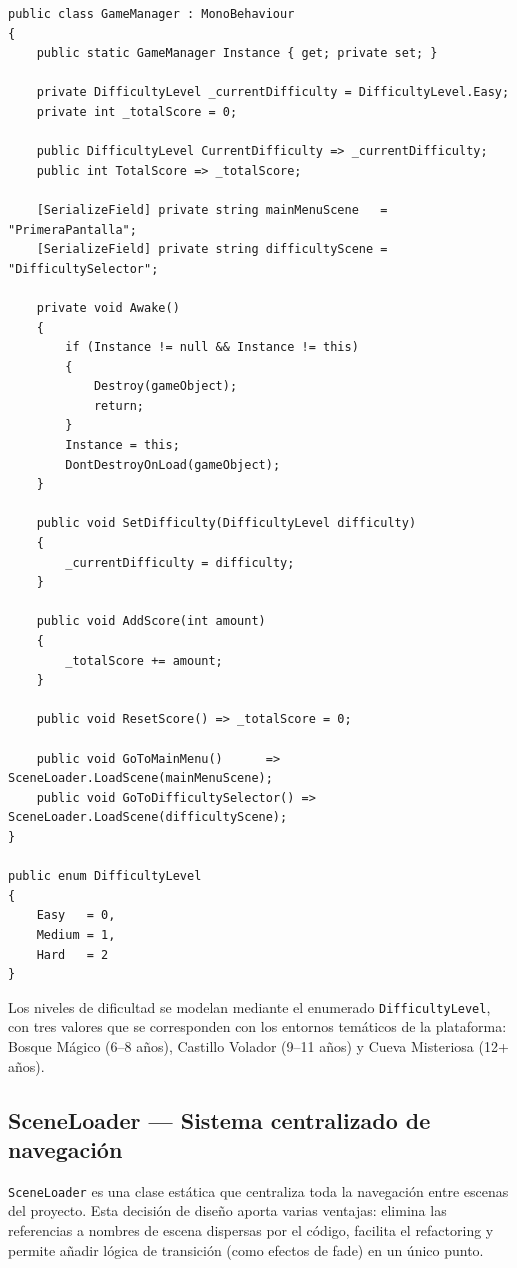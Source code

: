 \documentclass[12pt, a4paper]{report}
\begin{document}
\begin{lstlisting}[caption={GameManager.cs — Implementación del Singleton con persistencia},
                   label={lst:gamemanager}]
public class GameManager : MonoBehaviour
{
    public static GameManager Instance { get; private set; }

    private DifficultyLevel _currentDifficulty = DifficultyLevel.Easy;
    private int _totalScore = 0;

    public DifficultyLevel CurrentDifficulty => _currentDifficulty;
    public int TotalScore => _totalScore;

    [SerializeField] private string mainMenuScene   = "PrimeraPantalla";
    [SerializeField] private string difficultyScene = "DifficultySelector";

    private void Awake()
    {
        if (Instance != null && Instance != this)
        {
            Destroy(gameObject);
            return;
        }
        Instance = this;
        DontDestroyOnLoad(gameObject);
    }

    public void SetDifficulty(DifficultyLevel difficulty)
    {
        _currentDifficulty = difficulty;
    }

    public void AddScore(int amount)
    {
        _totalScore += amount;
    }

    public void ResetScore() => _totalScore = 0;

    public void GoToMainMenu()      => SceneLoader.LoadScene(mainMenuScene);
    public void GoToDifficultySelector() => SceneLoader.LoadScene(difficultyScene);
}

public enum DifficultyLevel
{
    Easy   = 0,
    Medium = 1,
    Hard   = 2
}
\end{lstlisting}

Los niveles de dificultad se modelan mediante el enumerado
\texttt{DifficultyLevel}, con tres valores que se corresponden con los
entornos temáticos de la plataforma: Bosque Mágico (6--8 años), Castillo
Volador (9--11 años) y Cueva Misteriosa (12+ años).

\subsection{SceneLoader — Sistema centralizado de navegación}

\texttt{SceneLoader} es una clase estática que centraliza toda la navegación
entre escenas del proyecto. Esta decisión de diseño aporta varias ventajas:
elimina las referencias a nombres de escena dispersas por el código, facilita
el refactoring y permite añadir lógica de transición (como efectos de fade)
en un único punto.
\end{document}
